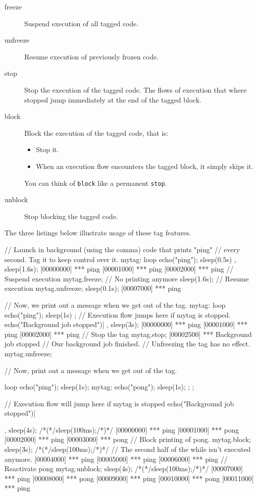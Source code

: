\begin{description}
\item[freeze] Suspend execution of all tagged code.
\item[unfreeze] Resume execution of previously frozen code.
\item[stop] Stop the execution of the tagged code. The flows of
  execution that where stopped jump immediately at the end of the
  tagged block.
\item[block] Block the execution of the tagged code, that is:
  \begin{itemize}
  \item Stop it.
  \item When an execution flow encounters the tagged block, it simply
    skips it.
  \end{itemize}
  You can think of \lstinline{block} like a permanent \lstinline{stop}.
\item[unblock] Stop blocking the tagged code.
\end{description}

The three listings below illustrate usage of these tag features.

\begin{urbiscript}
// Launch in background (using the comma) code that prints "ping"
// every second.  Tag it to keep control over it.
mytag:
{
  loop
  {
    echo("ping");
    sleep(0.5s)
  }
},
sleep(1.6s);
[00000000] *** ping
[00001000] *** ping
[00002000] *** ping
// Suspend execution
mytag.freeze;
// No printing anymore
sleep(1.6s);
// Resume execution
mytag.unfreeze;
sleep(0.1s);
[00007000] *** ping
\end{urbiscript}

\begin{urbiscript}
// Now, we print out a message when we get out of the tag.
{
  mytag:
  {
    loop
    {
      echo("ping"); sleep(1s)
    }
  };
  // Execution flow jumps here if mytag is stopped.
  echo("Background job stopped")|
},
sleep(3s);
[00000000] *** ping
[00001000] *** ping
[00002000] *** ping
// Stop the tag
mytag.stop;
[00002500] *** Background job stopped
// Our background job finished.
// Unfreezing the tag has no effect.
mytag.unfreeze;
\end{urbiscript}

\begin{urbiscript}
// Now, print out a message when we get out of the tag.
{
  loop
  {
    echo("ping"); sleep(1s);
    mytag: { echo("pong"); sleep(1s); };
  };

  // Execution flow will jump here if mytag is stopped
  echo("Background job stopped")|
},
sleep(4s);
/*(*/sleep(100ms);/*)*/
[00000000] *** ping
[00001000] *** pong
[00002000] *** ping
[00003000] *** pong
// Block printing of pong.
mytag.block;
sleep(3s);
/*(*/sleep(100ms);/*)*/
// The second half of the while isn't executed anymore.
[00004000] *** ping
[00005000] *** ping
[00006000] *** ping
// Reactivate pong
mytag.unblock;
sleep(4s);
/*(*/sleep(100ms);/*)*/
[00007000] *** ping
[00008000] *** pong
[00009000] *** ping
[00010000] *** pong
[00011000] *** ping
\end{urbiscript}

